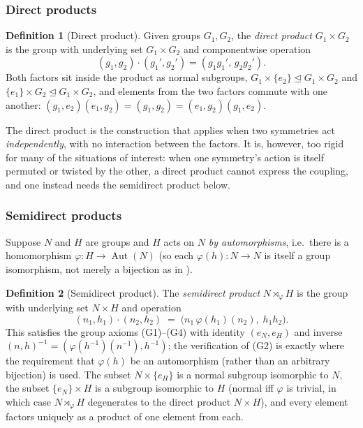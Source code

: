 \documentclass[11pt]{article}
\theoremstyle{plain}
\theoremstyle{definition}
\newtheorem{Definition}{Definition}[section]
\begin{document}
\subsubsection{Direct products}
\label{subsubsec:direct-products}

\begin{Definition}[Direct product]
\label{def:direct-product}
Given groups $G_1, G_2$, the \emph{direct product} $G_1 \times G_2$ is the
group with underlying set $G_1 \times G_2$ and componentwise operation
\[
    (g_1, g_2) \cdot (g_1', g_2') = (g_1 g_1',\, g_2 g_2').
\]
Both factors sit inside the product as normal subgroups,
$G_1 \times \{e_2\} \trianglelefteq G_1 \times G_2$ and
$\{e_1\} \times G_2 \trianglelefteq G_1 \times G_2$, and elements from the
two factors commute with one another: $(g_1,e_2)(e_1,g_2) = (g_1,g_2) =
(e_1,g_2)(g_1,e_2)$.
\end{Definition}

The direct product is the construction that applies when two symmetries act
\emph{independently}, with no interaction between the factors. It is,
however, too rigid for many of the situations of interest: when one
symmetry's action is itself permuted or twisted by the other, a direct
product cannot express the coupling, and one instead needs the semidirect
product below.

\subsubsection{Semidirect products}
\label{subsubsec:semidirect-products}

Suppose $N$ and $H$ are groups and $H$ acts on $N$ \emph{by automorphisms},
i.e.\ there is a homomorphism $\varphi : H \to \operatorname{Aut}(N)$ (so each
$\varphi(h) : N \to N$ is itself a group isomorphism, not merely a bijection
as in ).

\begin{Definition}[Semidirect product]
\label{def:semidirect-product}
The \emph{semidirect product} $N \rtimes_\varphi H$ is the group with
underlying set $N \times H$ and operation
\[
    (n_1, h_1) \cdot (n_2, h_2) \;=\; \bigl(n_1 \, \varphi(h_1)(n_2),\; h_1 h_2 \bigr).
\]
This satisfies the group axioms (G1)--(G4) with identity $(e_N, e_H)$ and
inverse $(n,h)^{-1} = (\varphi(h^{-1})(n^{-1}), h^{-1})$; the verification of
(G2) is exactly where the requirement that $\varphi(h)$ be an automorphism
(rather than an arbitrary bijection) is used. The subset
$N \times \{e_H\}$ is a normal subgroup isomorphic to $N$, the subset
$\{e_N\} \times H$ is a subgroup isomorphic to $H$ (normal iff $\varphi$ is
trivial, in which case $N \rtimes_\varphi H$ degenerates to the direct
product $N \times H$), and every element factors uniquely as a product of
one element from each.
\end{Definition}
\end{document}

